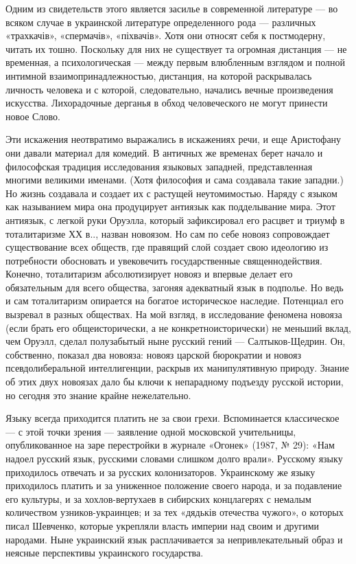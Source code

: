 Одним из свидетельств этого является засилье в современной литературе --- во
всяком случае в украинской литературе определенного рода --- различных
«трахкачів», «спермачів», «піхвачів». Хотя они относят себя к постмодерну,
читать их тошно. Поскольку для них не существует та огромная дистанция --- не
временная, а психологическая --- между первым влюбленным взглядом и полной
интимной взаимопринадлежностью, дистанция, на которой раскрывалась личность
человека и с которой, следовательно, начались вечные произведения искусства.
Лихорадочные дерганья в обход человеческого не могут принести новое Слово.

Эти искажения неотвратимо выражались в искажениях речи, и еще Аристофану они
давали материал для комедий. В античных же временах берет начало и философская
традиция исследования языковых западней, представленная многими великими
именами. (Хотя философия и сама создавала такие западни.) Но жизнь создавала и
создает их с растущей неутомимостью. Наряду с языком как называнием мира она
продуцирует антиязык как подделывание мира. Этот антиязык, с легкой руки
Оруэлла, который зафиксировал его расцвет и триумф в тоталитаризме ХХ в..,
назван новоязом. Но сам по себе новояз сопровождает существование всех обществ,
где правящий слой создает свою идеологию из потребности обосновать и
увековечить государственные священнодействия. Конечно, тоталитаризм
абсолютизирует новояз и впервые делает его обязательным для всего общества,
загоняя адекватный язык в подполье. Но ведь и сам тоталитаризм опирается на
богатое историческое наследие. Потенциал его вызревал в разных обществах. На
мой взгляд, в исследование феномена новояза (если брать его общеисторически, а
не конкретноисторически) не меньший вклад, чем Оруэлл, сделал полузабытый ныне
русский гений --- Салтыков-Щедрин. Он, собственно, показал два новояза: новояз
царской бюрократии и новояз псевдолиберальной интеллигенции, раскрыв их
манипулятивную природу. Знание об этих двух новоязах дало бы ключи к
непарадному подъезду русской истории, но сегодня это знание крайне
нежелательно.

Языку всегда приходится платить не за свои грехи. Вспоминается классическое --- с
этой точки зрения --- заявление одной московской учительницы, опубликованное на
заре перестройки в журнале «Огонек» (1987, № 29): «Нам надоел русский язык,
русскими словами слишком долго врали». Русскому языку приходилось отвечать и за
русских колонизаторов. Украинскому же языку приходилось платить и за униженное
положение своего народа, и за подавление его культуры, и за хохлов-вертухаев в
сибирских концлагерях с немалым количеством узников-украинцев; и за тех
«дядьків отечества чужого», о которых писал Шевченко, которые укрепляли власть
империи над своим и другими народами. Ныне украинский язык расплачивается за
непривлекательный образ и неясные перспективы украинского государства.

